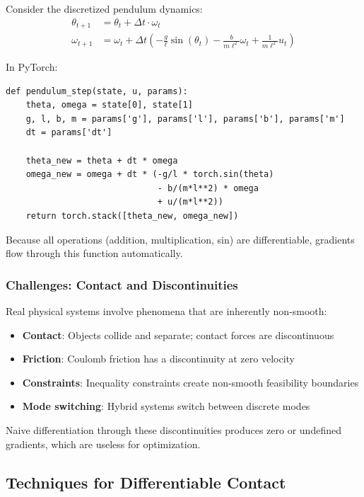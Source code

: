 \begin{example}
\label{ex:diff_pendulum}
Consider the discretized pendulum dynamics:
\begin{align}
\theta_{t+1} &= \theta_t + \Delta t \cdot \omega_t \\
\omega_{t+1} &= \omega_t + \Delta t \left( -\frac{g}{\ell} \sin(\theta_t) - \frac{b}{m\ell^2} \omega_t + \frac{1}{m\ell^2} u_t \right)
\end{align}

In PyTorch:
\begin{verbatim}
def pendulum_step(state, u, params):
    theta, omega = state[0], state[1]
    g, l, b, m = params['g'], params['l'], params['b'], params['m']
    dt = params['dt']

    theta_new = theta + dt * omega
    omega_new = omega + dt * (-g/l * torch.sin(theta)
                              - b/(m*l**2) * omega
                              + u/(m*l**2))
    return torch.stack([theta_new, omega_new])
\end{verbatim}

Because all operations (addition, multiplication, sin) are differentiable, gradients flow through this function automatically.
\end{example}

\subsubsection{Challenges: Contact and Discontinuities}

Real physical systems involve phenomena that are inherently non-smooth:

\begin{itemize}
    \item \textbf{Contact}: Objects collide and separate; contact forces are discontinuous
    \item \textbf{Friction}: Coulomb friction has a discontinuity at zero velocity
    \item \textbf{Constraints}: Inequality constraints create non-smooth feasibility boundaries
    \item \textbf{Mode switching}: Hybrid systems switch between discrete modes
\end{itemize}

Naive differentiation through these discontinuities produces zero or undefined gradients, which are useless for optimization.

\subsection{Techniques for Differentiable Contact}

